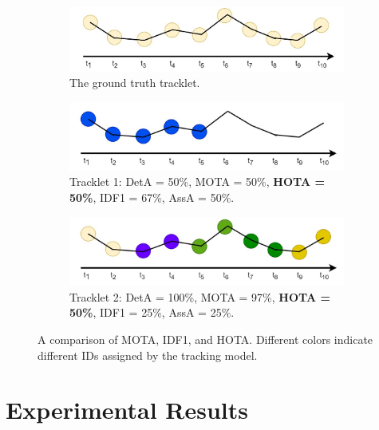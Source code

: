 \begin{figure}[H]
    \centering
    \begin{subfigure}[b]{\textwidth}
        \centering
        \includegraphics[width=\linewidth]{figures/chapter_tracking/IDSW_gt.jpg}
        \caption{The ground truth tracklet.}
        \label{fig:track_hota_gt} 
    \end{subfigure}
    \begin{subfigure}[b]{\textwidth}
        \centering
        \includegraphics[width=\linewidth]{figures/chapter_tracking/HOTA_track_1.jpg}
        \caption{Tracklet 1: DetA = 50\%, MOTA = 50\%, \textbf{HOTA = 50\%}, IDF1 = 67\%, AssA = 50\%.}
        \label{fig:track_hota_track_1}
    \end{subfigure}
    \begin{subfigure}[b]{\textwidth}
        \centering
        \includegraphics[width=\linewidth]{figures/chapter_tracking/HOTA_Track_2.jpg}
        \caption{Tracklet 2: DetA = 100\%, MOTA = 97\%, \textbf{HOTA = 50\%}, IDF1 = 25\%, AssA = 25\%.}
        \label{fig:track_hota_track_2}
    \end{subfigure}
  \caption{A comparison of MOTA, IDF1, and HOTA. Different colors indicate different IDs assigned by the tracking model.}
  \label{fig:tracking_hota}
\end{figure}

\clearpage

\section{Experimental Results}

